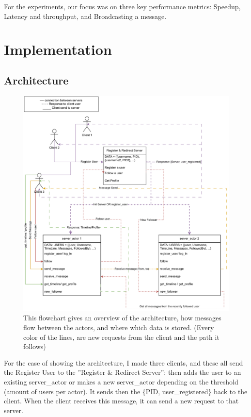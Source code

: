 \documentclass[a4paper]{article}
\begin{document}
For the experiments, our focus was on three key performance metrics: Speedup, Latency and throughput, and Broadcasting a message. 


\section{Implementation}

\subsection{Architecture}

\begin{figure}[H]
	\centering
	\includegraphics[width = \linewidth]{Architecture.pdf}
	\caption{
		This flowchart gives an overview of the architecture, how messages flow between the actors, and where which data is stored. (Every color of the lines, are new requests from the client and the path it follows)
	}
\end{figure}

For the case of showing the architecture, I made three clients, and these all send the Register User to the ''Register \& Redirect Server''; then adds the user to an existing server\_actor or makes a new server\_actor depending on the threshold (amount of users per actor).
It sends then the \{PID, user\_registered\} back to the client. When the client receives this message, it can send a new request to that server. 
\end{document}
